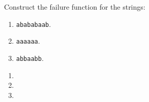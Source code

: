 \begin{exercise}\label{ex:030403}
    Construct the failure function for the strings:
    \begin{enumerate}[label=\alph*)]
        \item \texttt{abababaab}.
        \item \texttt{aaaaaa}.
        \item \texttt{abbaabb}.
    \end{enumerate}
\end{exercise}
\begin{solution}\label{sol:030403}
    \begin{enumerate}[label=\alph*)]
        \item 
        \item 
        \item 
    \end{enumerate}
\end{solution}